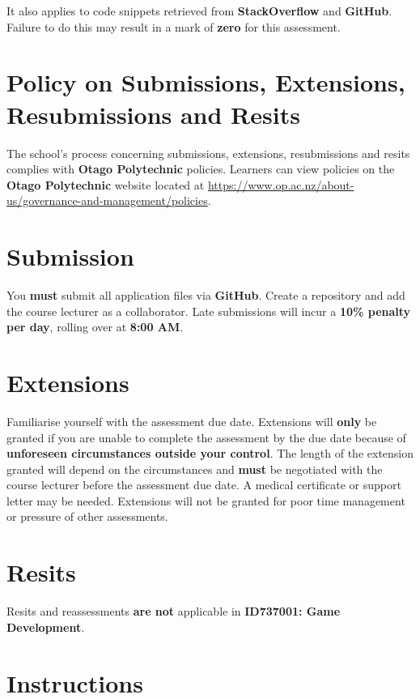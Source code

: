 \documentclass{article}
\begin{document}
It also applies to code snippets retrieved from \textbf{StackOverflow} and \textbf{GitHub}. \\
 
Failure to do this may result in a mark of \textbf{zero} for this assessment.

\section*{Policy on Submissions, Extensions, Resubmissions and Resits}
The school's process concerning submissions, extensions, resubmissions and resits complies with \textbf{Otago Polytechnic} policies. Learners can view policies on the \textbf{Otago Polytechnic} website located at \href{https://www.op.ac.nz/about-us/governance-and-management/policies}{https://www.op.ac.nz/about-us/governance-and-management/policies}.

\section*{Submission}
You \textbf{must} submit all application files via \textbf{GitHub}. Create a repository and add the course lecturer as a collaborator. Late submissions will incur a \textbf{10\% penalty per day}, rolling over at \textbf{8:00 AM}.

\section*{Extensions}
Familiarise yourself with the assessment due date. Extensions will \textbf{only} be granted if you are unable to complete the assessment by the due date because of \textbf{unforeseen circumstances outside your control}. The length of the extension granted will depend on the circumstances and \textbf{must} be negotiated with the course lecturer before the assessment due date. A medical certificate or support letter may be needed. Extensions will not be granted for poor time management or pressure of other assessments.

\section*{Resits}
Resits and reassessments \textbf{are not} applicable in \textbf{ID737001: Game Development}.

\section*{Instructions}
\end{document}
